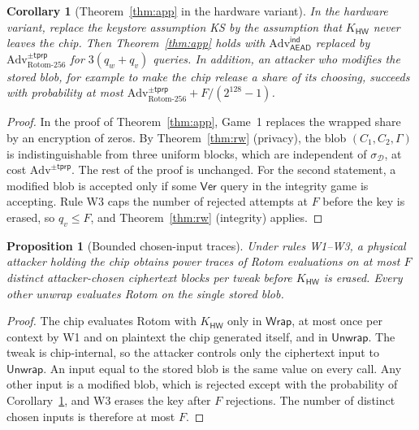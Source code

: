 \documentclass[11pt]{article}
\newtheorem{corollary}{Corollary}
\newtheorem{proposition}{Proposition}
\theoremstyle{remark}
\begin{document}
\begin{corollary}[Theorem~\ref{thm:app} in the hardware variant]
\label{cor:hwapp}
In the hardware variant, replace the keystore assumption KS by the assumption that $K_{\mathsf{HW}}$ never leaves the chip. Then Theorem~\ref{thm:app} holds with $\mathrm{Adv}^{\mathsf{ind}}_{\mathsf{AEAD}}$ replaced by $\mathrm{Adv}^{\pm\mathsf{tprp}}_{\mathrm{Rotom}\text{-}256}$ for $3(q_w + q_v)$ queries. In addition, an attacker who modifies the stored blob, for example to make the chip release a share of its choosing, succeeds with probability at most $\mathrm{Adv}^{\pm\mathsf{tprp}}_{\mathrm{Rotom}\text{-}256} + F/(2^{128}-1)$.
\end{corollary}
\begin{proof}
In the proof of Theorem~\ref{thm:app}, Game~1 replaces the wrapped share by an encryption of zeros. By Theorem~\ref{thm:rw} (privacy), the blob $(C_1, C_2, \Gamma)$ is indistinguishable from three uniform blocks, which are independent of $\sigma_{\mathcal{D}}$, at cost $\mathrm{Adv}^{\pm\mathsf{tprp}}$. The rest of the proof is unchanged. For the second statement, a modified blob is accepted only if some $\mathsf{Ver}$ query in the integrity game is accepting. Rule W3 caps the number of rejected attempts at $F$ before the key is erased, so $q_v \le F$, and Theorem~\ref{thm:rw} (integrity) applies.
\end{proof}

\begin{proposition}[Bounded chosen-input traces]
\label{prop:dpa}
Under rules W1--W3, a physical attacker holding the chip obtains power traces of Rotom evaluations on at most $F$ distinct attacker-chosen ciphertext blocks per tweak before $K_{\mathsf{HW}}$ is erased. Every other unwrap evaluates Rotom on the single stored blob.
\end{proposition}
\begin{proof}
The chip evaluates Rotom with $K_{\mathsf{HW}}$ only in $\mathsf{Wrap}$, at most once per context by W1 and on plaintext the chip generated itself, and in $\mathsf{Unwrap}$. The tweak is chip-internal, so the attacker controls only the ciphertext input to $\mathsf{Unwrap}$. An input equal to the stored blob is the same value on every call. Any other input is a modified blob, which is rejected except with the probability of Corollary~\ref{cor:hwapp}, and W3 erases the key after $F$ rejections. The number of distinct chosen inputs is therefore at most $F$.
\end{proof}
\end{document}
